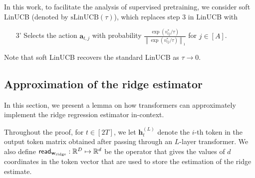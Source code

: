 \documentclass[10pt]{article}
\newcommand{\norm}[1]{\left\|{#1}\right\|}
\newcommand{\lone}[1]{\norm{#1}_1}
\newcommand{\<}{\left\langle}
\renewcommand{\>}{\right\rangle}
\renewcommand{\read}{{\sf read}}
\newcommand{\ridge}{{\rm ridge}}
\newcommand{\R}{\mathbb{R}}
\newcommand{\sLinUCB}{{\mathrm{sLinUCB}}}
\newcommand{\temp}{{\tau}}
\newcommand{\totlen}{{T}}
\def\ba{{\mathbf a}}
\def\bh{{\mathbf h}}
\def\bw{{\mathbf w}}
\begin{document}
In this work, to facilitate the analysis of supervised pretraining, we consider soft LinUCB (denoted by $\sLinUCB(\temp)$), which replaces step 3 in LinUCB with
\begin{enumerate}
    \item [3'] Selects the action $\ba_{t,j}$ with probability $\frac{\exp(v^*_{tj}/\temp)}{\lone{\exp(v^*_{tj}/\temp)}}$ for $j\in[A]$.
\end{enumerate} Note that soft LinUCB recovers the standard LinUCB as $\temp\to0$.













\subsection{Approximation of the ridge estimator}\label{app:approx-ridge-estimator}
In this section, we present a lemma on how transformers can  approximately implement the ridge regression estimator in-context.






















Throughout the proof, for $t\in[2\totlen]$,  we let $\bh_{t}^{(L)}$ denote the $i$-th token in the output token matrix obtained after passing through an $L$-layer transformer. We also define  $\read_{\bw_\ridge}: \R^{D}\mapsto\R^{d}$ be the operator that gives the values of  $d$ coordinates  in the token vector that are used to store the estimation of  the ridge estimate.
\end{document}
